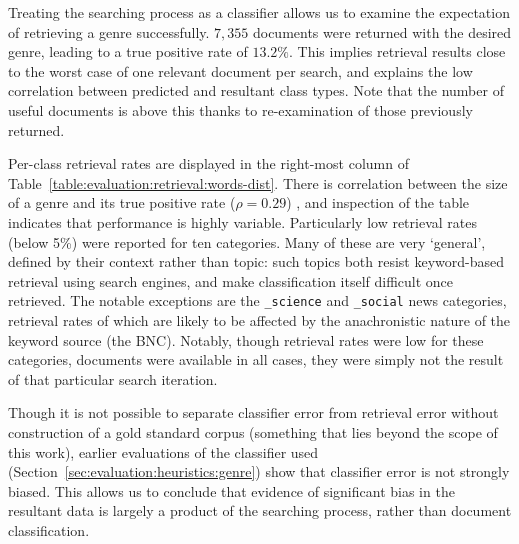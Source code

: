 
Treating the searching process as a classifier allows us to examine the expectation of retrieving a genre successfully.  $7,355$ documents were returned with the desired genre, leading to a true positive rate of $13.2\%$.  This implies retrieval results close to the worst case of one relevant document per search, and explains the low correlation between predicted and resultant class types.  Note that the number of useful documents is above this thanks to re-examination of those previously returned.

Per-class retrieval rates are displayed in the right-most column of Table~\ref{table:evaluation:retrieval:words-dist}.  There is correlation between the size of a genre and its true positive rate ($\rho = 0.29$)%
, and inspection of the table indicates that performance is highly variable.  Particularly low retrieval rates (below 5\%) were reported for ten categories.  Many of these are very `general', defined by their context rather than topic: such topics both resist keyword-based retrieval using search engines, and make classification itself difficult once retrieved.  The notable exceptions are the \texttt{\_science} and \texttt{\_social} news categories, retrieval rates of which are likely to be affected by the anachronistic nature of the keyword source (the BNC).  Notably, though retrieval rates were low for these categories, documents were available in all cases, they were simply not the result of that particular search iteration.

Though it is not possible to separate classifier error from retrieval error without construction of a gold standard corpus (something that lies beyond the scope of this work), earlier evaluations of the classifier used (Section~\ref{sec:evaluation:heuristics:genre}) show that classifier error is not strongly biased.  This allows us to conclude that evidence of significant bias in the resultant data is largely a product of the searching process, rather than document classification.





